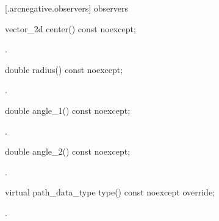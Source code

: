  [\iotwod.arcnegative.observers]{ observers}

\begin{itemdecl}
    vector_2d center() const noexcept;
\end{itemdecl}
\begin{itemdescr}
	\pnum
	\returns
	.

\end{itemdescr}

\begin{itemdecl}
    double radius() const noexcept;
\end{itemdecl}
\begin{itemdescr}
	\pnum
	\returns
	.

\end{itemdescr}

\begin{itemdecl}
    double angle_1() const noexcept;
\end{itemdecl}
\begin{itemdescr}
	\pnum
	\returns
	.

\end{itemdescr}

\begin{itemdecl}
    double angle_2() const noexcept;
\end{itemdecl}
\begin{itemdescr}
	\pnum
	\returns
	.

\end{itemdescr}

\begin{itemdecl}
    virtual path_data_type type() const noexcept override;
\end{itemdecl}
\begin{itemdescr}
	\pnum
	\returns
	.

\end{itemdescr}
